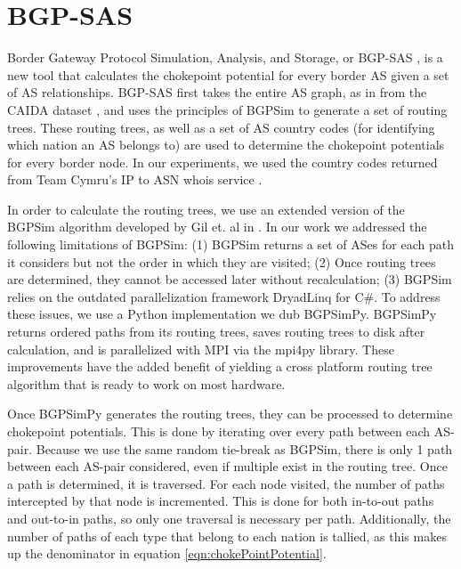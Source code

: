 \documentclass[10pt, conference, letterpaper]{IEEEtran}
\newcommand{\toolname}{BGP-SAS }
\begin{document}
\section{\toolname}

Border Gateway Protocol Simulation, Analysis, and Storage, or \toolname, is a new tool that calculates the chokepoint potential for every border AS given a set of AS relationships.
\toolname first takes the entire AS graph, as in from the CAIDA dataset \cite{CAIDA}, and uses the principles of BGPSim \cite{quicksand}
to generate a set of routing trees. These routing trees, as well as a set of AS country codes (for identifying which nation an AS belongs to)
are used to determine the chokepoint potentials for every border node. In our experiments, we used the country codes returned from Team Cymru's
IP to ASN whois service \cite{cymru}.

\par
In order to calculate the routing trees, we use an extended version of the BGPSim algorithm developed by Gil et. al in \cite{quicksand}. In
our work we addressed the following limitations of BGPSim: (1) BGPSim returns a set of ASes for each path it considers but not the order in which
they are visited; (2) Once routing trees are determined, they cannot be accessed later without recalculation; (3) BGPSim relies on the outdated parallelization
framework DryadLinq for C\#. To address these issues, we use a Python implementation we dub BGPSimPy. BGPSimPy returns ordered paths from its routing trees,
saves routing trees to disk after calculation, and is parallelized with MPI via the mpi4py library. These improvements have the added benefit of yielding a cross platform
routing tree algorithm that is ready to work on most hardware.

\par
Once BGPSimPy generates the routing trees, they can be processed to determine chokepoint potentials. This is done by iterating over every path between each AS-pair. Because
we use the same random tie-break as BGPSim, there is only 1 path between each AS-pair considered, even if multiple exist in the routing tree. Once a path is determined, it is
traversed. For each node visited, the number of paths intercepted by that node is incremented. This is done for both in-to-out paths and out-to-in paths, so only one traversal is
necessary per path. Additionally, the number of paths of each type that belong to each nation is tallied, as this makes up the denominator in equation \ref{eqn:chokePointPotential}.
\end{document}
